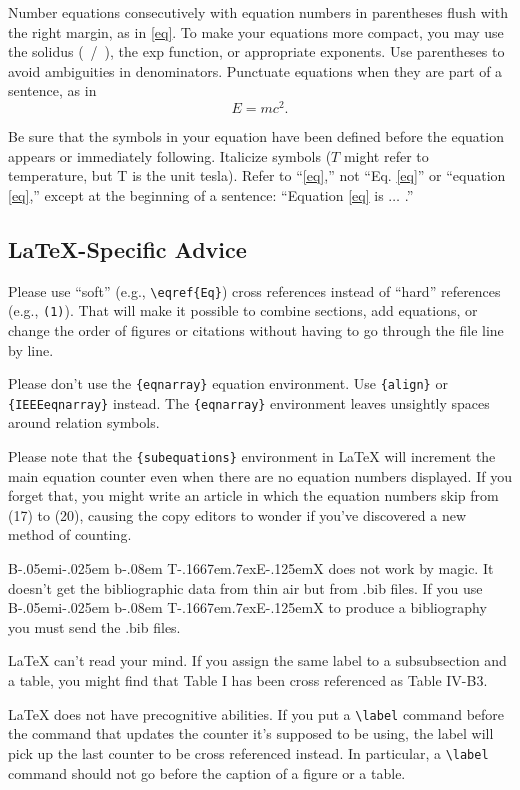 \documentclass[journal,twoside,web]{ieeecolor2}
\def\BibTeX{{\rm B\kern-.05em{\sc i\kern-.025em b}\kern-.08em
    T\kern-.1667em\lower.7ex\hbox{E}\kern-.125emX}}
\begin{document}
Number equations consecutively with equation numbers in parentheses flush 
with the right margin, as in \eqref{eq}.
To make your equations more 
compact, you may use the solidus (~/~), the exp function, or appropriate 
exponents.
Use parentheses to avoid ambiguities in denominators.
Punctuate 
equations when they are part of a sentence, as in
\begin{equation}E=mc^2.\label{eq}\end{equation}

Be sure that the symbols in your equation have been defined before the 
equation appears or immediately following.
Italicize symbols ($T$ might refer 
to temperature, but T is the unit tesla).
Refer to ``\eqref{eq},'' not ``Eq.
\eqref{eq}'' 
or ``equation \eqref{eq},'' except at the beginning of a sentence: ``Equation \eqref{eq} 
is $\ldots$ .''

\subsection{\LaTeX-Specific Advice}

Please use ``soft'' (e.g., \verb|\eqref{Eq}|) cross references instead
of ``hard'' references (e.g., \verb|(1)|).
That will make it possible
to combine sections, add equations, or change the order of figures or
citations without having to go through the file line by line.

Please don't use the \verb|{eqnarray}| equation environment.
Use
\verb|{align}| or \verb|{IEEEeqnarray}| instead.
The \verb|{eqnarray}|
environment leaves unsightly spaces around relation symbols.

Please note that the \verb|{subequations}| environment in {\LaTeX}
will increment the main equation counter even when there are no
equation numbers displayed.
If you forget that, you might write an
article in which the equation numbers skip from (17) to (20), causing
the copy editors to wonder if you've discovered a new method of
counting.

{\BibTeX} does not work by magic.
It doesn't get the bibliographic
data from thin air but from .bib files.
If you use {\BibTeX} to produce a
bibliography you must send the .bib files.


{\LaTeX} can't read your mind.
If you assign the same label to a
subsubsection and a table, you might find that Table I has been cross
referenced as Table IV-B3.


{\LaTeX} does not have precognitive abilities.
If you put a
\verb|\label| command before the command that updates the counter it's
supposed to be using, the label will pick up the last counter to be
cross referenced instead.
In particular, a \verb|\label| command
should not go before the caption of a figure or a table.
\end{document}
